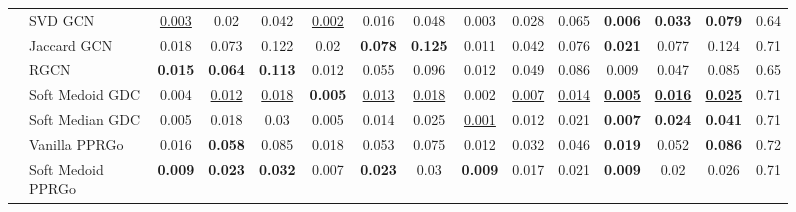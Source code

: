 \documentclass[sigconf, review]{acmart}
\begin{document}
\begin{figure*}[ht]
\begin{minipage}{0.56\textwidth}
{\begin{tabular}{llccccccccccccc}
                                  & SVD GCN &    \underline{0.003} &               0.02 &              0.042 &      \underline{0.002} &              0.016 &              0.048 &                       0.003 &              0.028 &              0.065 &              \textbf{0.006} &              \textbf{0.033} &              \textbf{0.079} &          0.64 \\
                                  & Jaccard GCN &                0.018 &              0.073 &              0.122 &                   0.02 &     \textbf{0.078} &     \textbf{0.125} &                       0.011 &              0.042 &              0.076 &              \textbf{0.021} &                       0.077 &                       0.124 &          0.71 \\
                                  & RGCN &       \textbf{0.015} &     \textbf{0.064} &     \textbf{0.113} &                  0.012 &              0.055 &              0.096 &                       0.012 &              0.049 &              0.086 &                       0.009 &                       0.047 &                       0.085 &          0.65 \\
                                  & Soft Medoid GDC &                0.004 &  \underline{0.012} &  \underline{0.018} &         \textbf{0.005} &  \underline{0.013} &  \underline{0.018} &                       0.002 &  \underline{0.007} &  \underline{0.014} &  \underline{\textbf{0.005}} &  \underline{\textbf{0.016}} &  \underline{\textbf{0.025}} &          0.71 \\
                                  & Soft Median GDC &                0.005 &              0.018 &               0.03 &                  0.005 &              0.014 &              0.025 &           \underline{0.001} &              0.012 &              0.021 &              \textbf{0.007} &              \textbf{0.024} &              \textbf{0.041} &          0.71 \\
                                  & Vanilla PPRGo &                0.016 &     \textbf{0.058} &              0.085 &                  0.018 &              0.053 &              0.075 &                       0.012 &              0.032 &              0.046 &              \textbf{0.019} &                       0.052 &              \textbf{0.086} &          0.72 \\
                                  & Soft Medoid PPRGo &       \textbf{0.009} &     \textbf{0.023} &     \textbf{0.032} &                  0.007 &     \textbf{0.023} &               0.03 &              \textbf{0.009} &              0.017 &              0.021 &              \textbf{0.009} &                        0.02 &                       0.026 &          0.71 \\

\end{tabular}}
\end{minipage}
\end{figure*}
\end{document}
